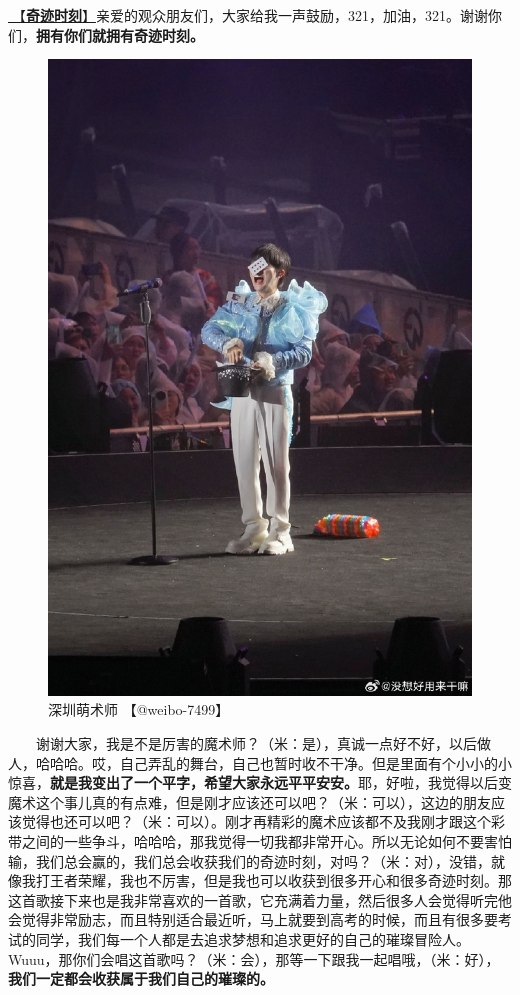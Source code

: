 \documentclass[]{ctexbook}
\begin{document}
\hyperref[magic-moment]{🎵【\textbf{奇迹时刻}】}亲爱的观众朋友们，大家给我一声鼓励，321，加油，321。谢谢你们，\textbf{拥有你们就拥有奇迹时刻。}

\begin{figure}

{\centering \includegraphics[width=400pt]{img/shenzhen20240601/001} 

}

\caption{深圳萌术师 【@weibo-7499】}\label{fig:unnamed-chunk-47}
\end{figure}

  谢谢大家，我是不是厉害的魔术师？（米：是），真诚一点好不好，以后做人，哈哈哈。哎，自己弄乱的舞台，自己也暂时收不干净。但是里面有个小小的小惊喜，\textbf{就是我变出了一个平字，希望大家永远平平安安。}耶，好啦，我觉得以后变魔术这个事儿真的有点难，但是刚才应该还可以吧？（米：可以），这边的朋友应该觉得也还可以吧？（米：可以）。刚才再精彩的魔术应该都不及我刚才跟这个彩带之间的一些争斗，哈哈哈，那我觉得一切我都非常开心。所以无论如何不要害怕输，我们总会赢的，我们总会收获我们的奇迹时刻，对吗？（米：对），没错，就像我打王者荣耀，我也不厉害，但是我也可以收获到很多开心和很多奇迹时刻。那这首歌接下来也是我非常喜欢的一首歌，它充满着力量，然后很多人会觉得听完他会觉得非常励志，而且特别适合最近听，马上就要到高考的时候，而且有很多要考试的同学，我们每一个人都是去追求梦想和追求更好的自己的璀璨冒险人。Wuuu，那你们会唱这首歌吗？（米：会），那等一下跟我一起唱哦，（米：好），\textbf{我们一定都会收获属于我们自己的璀璨的。}
\end{document}
